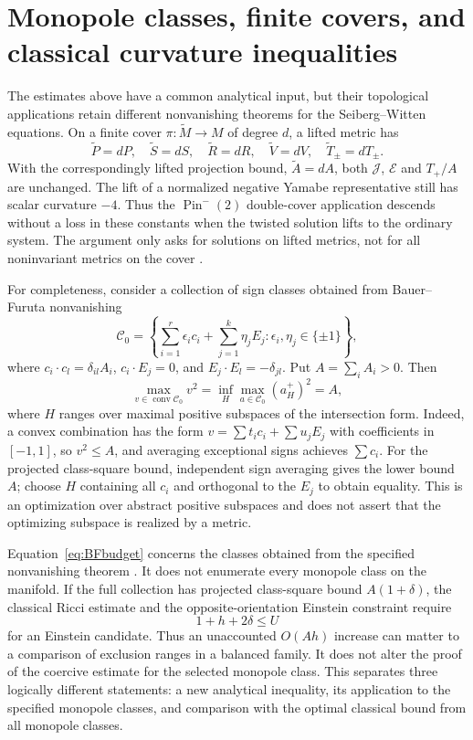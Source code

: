 \documentclass[11pt,a4paper]{article}
\theoremstyle{definition}
\theoremstyle{remark}
\newcommand{\J}{\mathcal J}
\newcommand{\E}{\mathcal E}
\begin{document}
\section{Monopole classes, finite covers, and classical curvature inequalities}
The estimates above have a common analytical input, but their topological applications retain different nonvanishing theorems for the Seiberg--Witten equations. On a finite cover $\pi:\widetilde M\to M$ of degree $d$, a lifted metric has
\[
 \widetilde P=dP,\quad\widetilde S=dS,\quad\widetilde R=dR,\quad
 \widetilde V=dV,\quad\widetilde T_\pm=dT_\pm.
\]
With the correspondingly lifted projection bound, $\widetilde A=dA$, both $\J$, $\E$ and $T_+/A$ are unchanged. The lift of a normalized negative Yamabe representative still has scalar curvature $-4$. Thus the $\operatorname{Pin}^{-}(2)$ double-cover application descends without a loss in these constants when the twisted solution lifts to the ordinary system. The argument only asks for solutions on lifted metrics, not for all noninvariant metrics on the cover \cite{Pin,N1source}.

For completeness, consider a collection of sign classes obtained from Bauer--Furuta nonvanishing
\[
 \mathcal C_0=\left\{\sum_{i=1}^r\epsilon_ic_i+\sum_{j=1}^k\eta_jE_j:
 \epsilon_i,\eta_j\in\{\pm1\}\right\},
\]
where $c_i\cdot c_l=\delta_{il}A_i$, $c_i\cdot E_j=0$, and
$E_j\cdot E_l=-\delta_{jl}$. Put $A=\sum_iA_i>0$. Then
\begin{equation}
 \max_{v\in\operatorname{conv}\mathcal C_0}v^2
 =\inf_H\max_{a\in\mathcal C_0}(a_H^+)^2=A,
 \label{eq:BFbudget}
\end{equation}
where $H$ ranges over maximal positive subspaces of the intersection form. Indeed, a convex combination has the form $v=\sum t_ic_i+\sum u_jE_j$ with coefficients in $[-1,1]$, so $v^2\le A$, and averaging exceptional signs achieves $\sum c_i$. For the projected class-square bound, independent sign averaging gives the lower bound $A$; choose $H$ containing all $c_i$ and orthogonal to the $E_j$ to obtain equality. This is an optimization over abstract positive subspaces and does not assert that the optimizing subspace is realized by a metric.

Equation~\eqref{eq:BFbudget} concerns the classes obtained from the specified nonvanishing theorem \cite{BFbudget}. It does not enumerate every monopole class on the manifold. If the full collection has projected class-square bound $A(1+\delta)$, the classical Ricci estimate and the opposite-orientation Einstein constraint require
\[
 1+h+2\delta\le U
\]
for an Einstein candidate. Thus an unaccounted $O(Ah)$ increase can matter to a comparison of exclusion ranges in a balanced family. It does not alter the proof of the coercive estimate for the selected monopole class. This separates three logically different statements: a new analytical inequality, its application to the specified monopole classes, and comparison with the optimal classical bound from all monopole classes.
\end{document}
